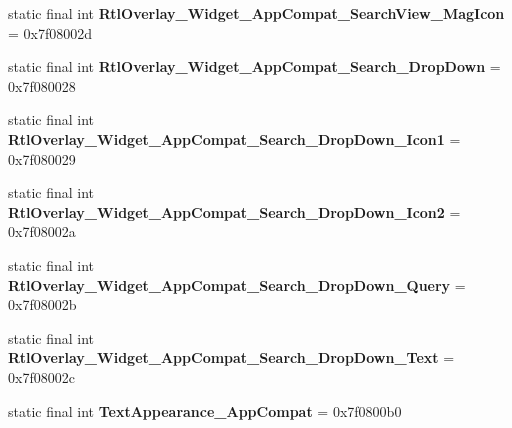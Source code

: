 \begin{DoxyCompactItemize}
\item 
\hypertarget{classandroid_1_1support_1_1v7_1_1appcompat_1_1_r_1_1style_af86deaaeed3a6ce46e3164ddfecf1dc4}{}static final int {\bfseries Rtl\+Overlay\+\_\+\+Widget\+\_\+\+App\+Compat\+\_\+\+Search\+View\+\_\+\+Mag\+Icon} = 0x7f08002d\label{classandroid_1_1support_1_1v7_1_1appcompat_1_1_r_1_1style_af86deaaeed3a6ce46e3164ddfecf1dc4}

\item 
\hypertarget{classandroid_1_1support_1_1v7_1_1appcompat_1_1_r_1_1style_a5e5fdfffdb11d965c660ba127baa6384}{}static final int {\bfseries Rtl\+Overlay\+\_\+\+Widget\+\_\+\+App\+Compat\+\_\+\+Search\+\_\+\+Drop\+Down} = 0x7f080028\label{classandroid_1_1support_1_1v7_1_1appcompat_1_1_r_1_1style_a5e5fdfffdb11d965c660ba127baa6384}

\item 
\hypertarget{classandroid_1_1support_1_1v7_1_1appcompat_1_1_r_1_1style_ab2fa2b3005166cd16d6868de78bf4747}{}static final int {\bfseries Rtl\+Overlay\+\_\+\+Widget\+\_\+\+App\+Compat\+\_\+\+Search\+\_\+\+Drop\+Down\+\_\+\+Icon1} = 0x7f080029\label{classandroid_1_1support_1_1v7_1_1appcompat_1_1_r_1_1style_ab2fa2b3005166cd16d6868de78bf4747}

\item 
\hypertarget{classandroid_1_1support_1_1v7_1_1appcompat_1_1_r_1_1style_ac0d2345330dd831f232f53ea121e66be}{}static final int {\bfseries Rtl\+Overlay\+\_\+\+Widget\+\_\+\+App\+Compat\+\_\+\+Search\+\_\+\+Drop\+Down\+\_\+\+Icon2} = 0x7f08002a\label{classandroid_1_1support_1_1v7_1_1appcompat_1_1_r_1_1style_ac0d2345330dd831f232f53ea121e66be}

\item 
\hypertarget{classandroid_1_1support_1_1v7_1_1appcompat_1_1_r_1_1style_abaa10d6dd2e8d619861a432668532862}{}static final int {\bfseries Rtl\+Overlay\+\_\+\+Widget\+\_\+\+App\+Compat\+\_\+\+Search\+\_\+\+Drop\+Down\+\_\+\+Query} = 0x7f08002b\label{classandroid_1_1support_1_1v7_1_1appcompat_1_1_r_1_1style_abaa10d6dd2e8d619861a432668532862}

\item 
\hypertarget{classandroid_1_1support_1_1v7_1_1appcompat_1_1_r_1_1style_a57c7183cd74f896000a7edc8600208d0}{}static final int {\bfseries Rtl\+Overlay\+\_\+\+Widget\+\_\+\+App\+Compat\+\_\+\+Search\+\_\+\+Drop\+Down\+\_\+\+Text} = 0x7f08002c\label{classandroid_1_1support_1_1v7_1_1appcompat_1_1_r_1_1style_a57c7183cd74f896000a7edc8600208d0}

\item 
\hypertarget{classandroid_1_1support_1_1v7_1_1appcompat_1_1_r_1_1style_a42b9227b2e55ee8feb8221dd6d1f3ec4}{}static final int {\bfseries Text\+Appearance\+\_\+\+App\+Compat} = 0x7f0800b0\label{classandroid_1_1support_1_1v7_1_1appcompat_1_1_r_1_1style_a42b9227b2e55ee8feb8221dd6d1f3ec4}


\end{DoxyCompactItemize}
